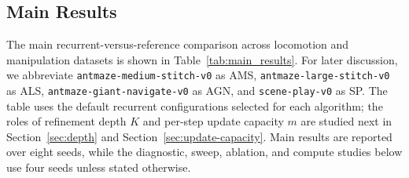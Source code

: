 \documentclass{article}
\begin{document}
\subsection{Main Results}\label{main-results}
The main recurrent-versus-reference comparison across locomotion and manipulation datasets is shown in Table~\ref{tab:main_results}.
For later discussion, we abbreviate \texttt{antmaze-medium-stitch-v0} as AMS, \texttt{antmaze-large-stitch-v0} as ALS, \texttt{antmaze-giant-navigate-v0} as AGN, and \texttt{scene-play-v0} as SP. The table uses the default recurrent configurations selected for each algorithm; the roles of refinement depth $K$ and per-step update capacity $m$ are studied next in Section~\ref{sec:depth} and Section~\ref{sec:update-capacity}. Main results are reported over eight seeds, while the diagnostic, sweep, ablation, and compute studies below use four seeds unless stated otherwise.
\end{document}
